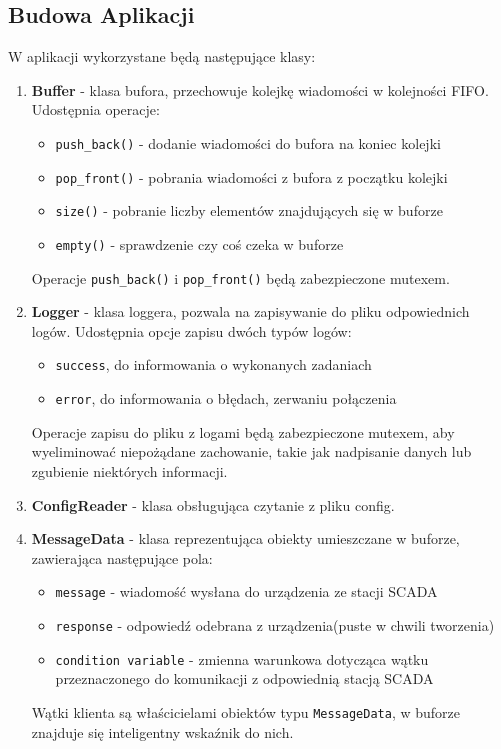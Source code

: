 \documentclass[a4paper]{article}
\begin{document}
\subsection{Budowa Aplikacji}
W aplikacji wykorzystane będą następujące klasy:
\begin{enumerate}
\item \textbf{Buffer} - klasa bufora, przechowuje kolejkę wiadomości w kolejności FIFO. Udostępnia operacje:
\begin{itemize}
\item \texttt{push\_back()} - dodanie wiadomości do bufora na koniec kolejki
\item \texttt{pop\_front()} - pobrania wiadomości z bufora z początku kolejki
\item \texttt{size()} - pobranie liczby elementów znajdujących się w buforze
\item \texttt{empty()} - sprawdzenie czy coś czeka w buforze
\end{itemize}
Operacje \texttt{push\_back()} i \texttt{pop\_front()} będą zabezpieczone mutexem.
\item \textbf{Logger} - klasa loggera, pozwala na zapisywanie do pliku odpowiednich logów. Udostępnia opcje zapisu dwóch typów logów:
\begin{itemize}
\item \texttt{success}, do informowania o wykonanych zadaniach
\item \texttt{error}, do informowania o błędach, zerwaniu połączenia
\end{itemize}
Operacje zapisu do pliku z logami będą zabezpieczone mutexem, aby wyeliminować niepożądane zachowanie, takie jak nadpisanie danych lub zgubienie niektórych informacji.
\item \textbf{ConfigReader} - klasa obsługująca czytanie z pliku config.
\item \textbf{MessageData} - klasa reprezentująca obiekty umieszczane w buforze, zawierająca następujące pola:
\begin{itemize}
\item \texttt{message} - wiadomość wysłana do urządzenia ze stacji SCADA
\item \texttt{response} - odpowiedź odebrana z urządzenia(puste w chwili tworzenia)
\item \texttt{condition variable} - zmienna warunkowa dotycząca wątku przeznaczonego do komunikacji z odpowiednią stacją SCADA
\end{itemize}
Wątki klienta są właścicielami obiektów typu \texttt{MessageData}, w buforze znajduje się inteligentny wskaźnik do nich.

\end{enumerate}
\end{document}
